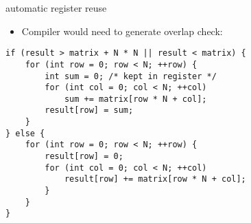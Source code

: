 \begin{frame}[fragile,label=registerReuseAuto2]{automatic register reuse}
\begin{itemize}
\item Compiler would need to generate overlap check:
\end{itemize}
\lstset{style=smaller,language=C}
\begin{lstlisting}
if (result > matrix + N * N || result < matrix) {
    for (int row = 0; row < N; ++row) {
        int sum = 0; /* kept in register */
        for (int col = 0; col < N; ++col)
            sum += matrix[row * N + col];
        result[row] = sum;
    }
} else {
    for (int row = 0; row < N; ++row) {
        result[row] = 0;
        for (int col = 0; col < N; ++col)
            result[row] += matrix[row * N + col];
        }
    }
}
\end{lstlisting}
\end{frame}
